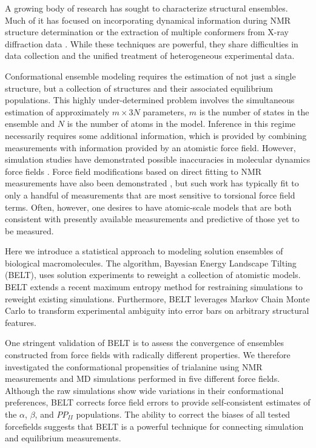 \documentclass[11pt,titlepage]{article}
\begin{document}
A growing body of research has sought to characterize structural ensembles.  Much of it has focused on incorporating dynamical information during NMR structure determination  \citep{lindorff2005simultaneous, lange2008recognition} or the extraction of multiple conformers from X-ray diffraction data  \citep{depristo2004heterogeneity, lang2010automated}.  While these techniques are powerful, they share difficulties in data collection and the unified treatment of heterogeneous experimental data.  

Conformational ensemble modeling requires the estimation of not just a single structure, but a collection of structures and their associated equilibrium populations.  This highly under-determined problem involves the simultaneous estimation of approximately $m\times 3N$ parameters, $m$ is the number of states in the ensemble and $N$ is the number of atoms in the model.  Inference in this regime necessarily requires some additional information, which is provided by combining measurements with information provided by an atomistic force field.  However, simulation studies have demonstrated possible inaccuracies in molecular dynamics force fields \citep{best2008, lindorff2012systematic, beauchamp2012protein}.  Force field modifications based on direct fitting to NMR measurements have also been demonstrated \cite{li2011iterative, best2012optimization, nerenberg2011}, but such work has typically fit to only a handful of measurements that are most sensitive to torsional force field terms.  Often, however, one desires to have atomic-scale models that are both consistent with presently available measurements and predictive of those yet to be measured.  

Here we introduce a statistical approach to modeling solution ensembles of biological macromolecules.  The algorithm, Bayesian Energy Landscape Tilting (BELT), uses solution experiments to reweight a collection of atomistic models.  BELT extends a recent maximum entropy method for restraining simulations  \citep{chodera2012} to reweight existing simulations.  Furthermore, BELT leverages Markov Chain Monte Carlo to transform experimental ambiguity into error bars on arbitrary structural features.  

One stringent validation of BELT is to assess the convergence of ensembles constructed from force fields with radically different properties.  We therefore investigated the conformational propensities of trialanine using NMR measurements \citep{Graf2007} and MD simulations performed in five different force fields.  Although the raw simulations show wide variations in their conformational preferences, BELT corrects force field errors to provide self-consistent estimates of the $\alpha$, $\beta$, and $PP_{II}$ populations.  The ability to correct the biases of all tested forcefields suggests that BELT is a powerful technique for connecting simulation and equilibrium measurements.  
\end{document}
